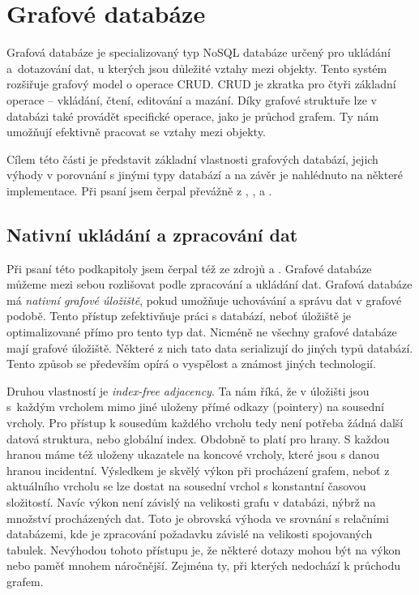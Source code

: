 \documentclass[
  program=infoi,
  biblatex=true,
  figures=true,
  glossaries=false,
  index,
  sourcecodes=true
]{kidiplom}
\begin{document}
\section{Grafové databáze}
Grafová databáze je specializovaný typ NoSQL databáze určený pro ukládání a~dotazování dat, u kterých jsou důležité vztahy mezi objekty. Tento systém rozšiřuje grafový model o operace CRUD. CRUD je zkratka pro čtyři základní operace -- vkládání, čtení, editování a mazání. Díky grafové struktuře lze v databázi také provádět specifické operace, jako je průchod grafem. Ty nám umožňují efektivně pracovat se vztahy mezi objekty.

Cílem této části je představit základní vlastnosti grafových databází, jejich výhody v porovnání s jinými typy databází a na závěr je nahlédnuto na některé implementace. Při psaní jsem čerpal převážně z \cite{graphDatabases}, \cite{influxdata}, \cite{Besta_2023} a \cite{ionos}.

\subsection{Nativní ukládání a zpracování dat}
Při psaní této podkapitoly jsem čerpal též ze zdrojů \cite{indexFreeAdjacency} a \cite{neo4jNative}. Grafové databáze můžeme mezi sebou rozlišovat podle zpracování a ukládání dat. Grafová databáze má \textit{nativní grafové úložiště}, pokud umožňuje uchovávání a správu dat v grafové podobě. Tento přístup zefektivňuje práci s databází, neboť úložiště je optimalizované přímo pro tento typ dat. Nicméně ne všechny grafové databáze mají grafové úložiště. Některé z nich tato data serializují do jiných typů databází. Tento způsob se především opírá o vyspělost a známost jiných technologií.

Druhou vlastností je \textit{index-free adjacency}. Ta nám říká, že v úložišti jsou s~každým vrcholem mimo jiné uloženy přímé odkazy (pointery) na sousední vrcholy. Pro přístup k sousedům každého vrcholu tedy není potřeba žádná další datová struktura, nebo globální index. Obdobně to platí pro hrany. S každou hranou máme též uloženy ukazatele na koncové vrcholy, které jsou s danou hranou incidentní. Výsledkem je skvělý výkon při procházení grafem, neboť z aktuálního vrcholu se lze dostat na sousední vrchol s konstantní časovou složitostí. Navíc výkon není závislý na velikosti grafu v databázi, nýbrž na množství procházených dat. Toto je obrovská výhoda ve srovnání s relačními databázemi, kde je zpracování požadavku závislé na velikosti spojovaných tabulek. Nevýhodou tohoto přístupu je, že některé dotazy mohou být na výkon nebo paměť mnohem náročnější. Zejména ty, při kterých nedochází k průchodu grafem.
\end{document}
